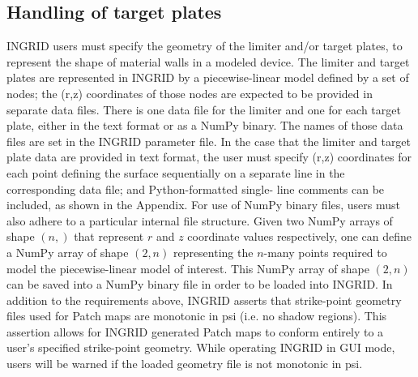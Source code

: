\subsection{Handling of target plates}
INGRID users must specify the geometry of the limiter and/or target plates, to represent the shape of material walls in a modeled device. The limiter and target plates are represented in INGRID by a piecewise-linear model defined by a set of nodes; the (r,z) coordinates of those nodes are expected to be provided in separate data files. There is one data file for the limiter and one for each target plate, either in the text format or as a NumPy binary. The names of those data files are set in the INGRID parameter file. In the case that the limiter and target plate data are provided in text format, the user must specify (r,z) coordinates for each point defining the surface sequentially on a separate line in the corresponding data file; and Python-formatted single- line comments can be included, as shown in the Appendix.
For use of NumPy binary files, users must also adhere to a particular internal file structure. Given two NumPy arrays of shape $(n, )$ that represent $r$ and $z$ coordinate values respectively, one can define a NumPy array of shape $(2,n)$ representing the $n$-many points required to model the piecewise-linear model of interest. This NumPy array of shape $(2, n)$ can be saved into a NumPy binary file in order to be loaded into INGRID.
In addition to the requirements above, INGRID asserts that strike-point geometry files used for Patch maps are monotonic in psi (i.e. no shadow regions). This assertion allows for INGRID generated Patch maps to conform entirely to a user's specified strike-point geometry. While operating INGRID in GUI mode, users will be warned if the loaded geometry file is not monotonic in psi. 